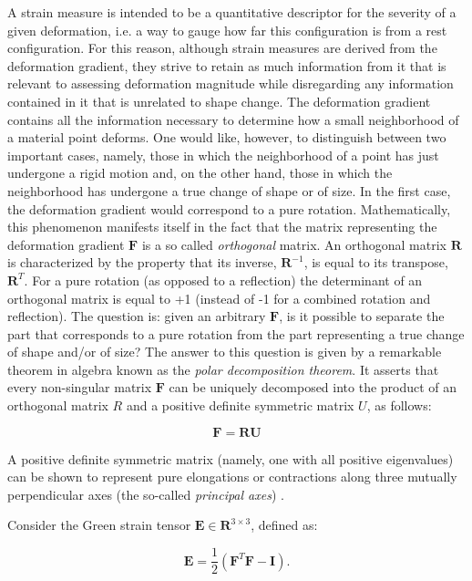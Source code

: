 A strain measure is intended to be a quantitative descriptor for the severity of a given deformation, i.e. a way to gauge how far this configuration is 
from a rest configuration. For this reason, although strain measures are derived from the deformation gradient, they strive to retain as much information 
from it that is relevant to assessing deformation magnitude while disregarding any information contained in it that is unrelated to shape change. 
The deformation gradient contains all the information necessary to determine how a small neighborhood of a material point deforms. One would like, 
however, to distinguish between two important cases, namely, those in which the neighborhood of a point has just undergone a rigid motion and, on the other 
hand, those in which the neighborhood has undergone a true change of shape or of size. In the first case, the deformation gradient would correspond to a 
pure rotation. Mathematically, this phenomenon manifests itself in the fact that the matrix representing the deformation gradient $\mathbf{F}$ is a so called
\textit{orthogonal} matrix. An orthogonal matrix $\mathbf{R}$ is characterized by the property that its inverse, $\mathbf{R}^{-1}$, is equal to its transpose,
$\mathbf{R}^T$. For a pure rotation (as opposed to a reflection) the determinant of an orthogonal matrix is equal to +1 (instead of -1 for a combined rotation
and reflection). The question is: given an arbitrary $\mathbf{F}$, is it possible to separate the part that corresponds to a pure rotation from the part 
representing a true change of shape and/or of size? The answer to this question is given by a remarkable theorem in algebra known as the 
\textit{polar decomposition theorem}. It asserts that every non-singular matrix $\mathbf{F}$ can be uniquely decomposed into the product of an orthogonal 
matrix $R$ and a positive definite symmetric matrix $U$, as follows:

\begin{equation}
\mathbf{F} =  \mathbf{R}\mathbf{U}
\end{equation}

A positive definite symmetric matrix (namely, one with all positive eigenvalues) can be shown to represent pure elongations or contractions along three 
mutually perpendicular axes (the so-called \textit{principal axes}) \cite{fung2001classical}.

Consider the Green strain tensor $\mathbf{E} \in \mathbf{R}^{3\times 3}$, defined as:

\begin{equation}
\mathbf{E} = \frac{1}{2}(\mathbf{F}^T\mathbf{F}-\mathbf{I}).
\end{equation}

